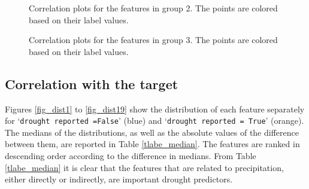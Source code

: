 \documentclass[10pt,parskip=half,
toc=sectionentrywithdots,
bibliography=totocnumbered,
captions=tableheading,numbers=noendperiod]{scrartcl}
\begin{document}
\begin{figure}[H]\begin{center}\end{center}\caption{Correlation plots for the features in group 2. The points are colored
based on their label values.}\label{pairplot2}\end{figure}

\begin{figure}[H]\begin{center}\end{center}\caption{Correlation plots for the features in group 3. The points are colored
based on their label values.}\label{pairplot3}\end{figure}

\hypertarget{correlation-with-the-target}{%
\subsection{Correlation with the
target}\label{correlation-with-the-target}}

Figures \ref{fig_dist1} to \ref{fig_dist19} show the distribution of
each feature separately for `\texttt{drought\ reported\ =False}' (blue)
and `\texttt{drought\ reported\ =\ True}' (orange). The medians of the
distributions, as well as the absolute values of the difference between
them, are reported in Table \ref{tlabe_median}. The features are ranked
in descending order according to the difference in medians. From Table
\ref{tlabe_median} it is clear that the features that are related to
precipitation, either directly or indirectly, are important drought
predictors.
\end{document}

